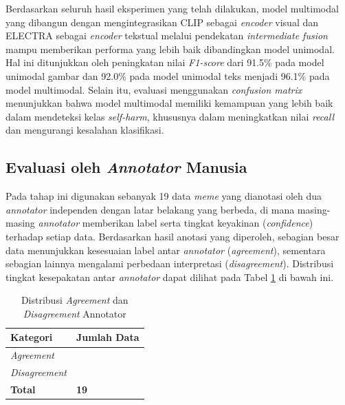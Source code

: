 Berdasarkan seluruh hasil eksperimen yang telah dilakukan,  model multimodal yang dibangun dengan mengintegrasikan CLIP sebagai \textit{encoder} visual dan ELECTRA sebagai \textit{encoder} tekstual melalui pendekatan \textit{intermediate fusion} mampu memberikan performa yang lebih baik dibandingkan model unimodal. Hal ini ditunjukkan oleh peningkatan nilai \textit{F1-score} dari 91.5\% pada model unimodal gambar dan 92.0\% pada model unimodal teks menjadi 96.1\% pada model multimodal. Selain itu, evaluasi menggunakan \textit{confusion matrix} menunjukkan bahwa model multimodal memiliki kemampuan yang lebih baik dalam mendeteksi kelas \textit{self-harm}, khususnya dalam meningkatkan nilai \textit{recall} dan mengurangi kesalahan klasifikasi.

\subsection{Evaluasi oleh \textit{Annotator} Manusia} \label{IV.Evaluasi Annotator}
Pada tahap ini digunakan sebanyak 19 data \textit{meme} yang dianotasi oleh dua \textit{annotator} independen dengan latar belakang yang berbeda, di mana masing-masing \textit{annotator} memberikan label serta tingkat keyakinan (\textit{confidence}) terhadap setiap data. Berdasarkan hasil anotasi yang diperoleh, sebagian besar data menunjukkan kesesuaian label antar \textit{annotator} (\textit{agreement}), sementara sebagian lainnya mengalami perbedaan interpretasi (\textit{disagreement}). Distribusi tingkat kesepakatan antar \textit{annotator} dapat dilihat pada Tabel \ref{tab:agreement_disagreement} di bawah ini.

\begin{table}[H]
    \centering
    \caption{Distribusi \textit{Agreement} dan \textit{Disagreement} Annotator}
    \label{tab:agreement_disagreement}
    \small
    \setlength{\tabcolsep}{4pt}
    \renewcommand{\arraystretch}{1.2}
    \begin{tabular}{>{\centering\arraybackslash}m{3cm} >{\centering\arraybackslash}m{2.8cm}}
        \hline
        \textbf{Kategori} & \textbf{Jumlah Data} \\
        \hline
        \textit{Agreement} & 14 \\
        \textit{Disagreement} & 5 \\
        \hline
        \textbf{Total} & \textbf{19} \\
        \hline
    \end{tabular}
\end{table}

